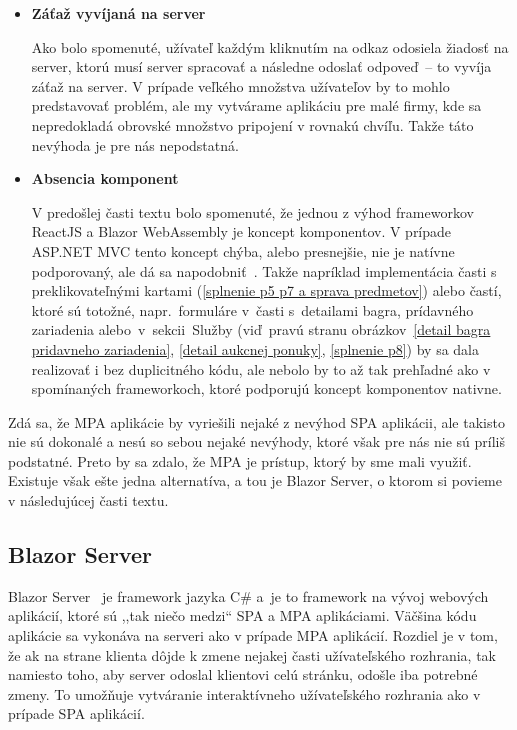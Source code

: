 \begin{itemize}
\item \textbf{Záťaž vyvíjaná na server}

Ako bolo spomenuté, užívateľ každým kliknutím na odkaz odosiela žiadosť na server, ktorú musí server spracovať a následne odoslať odpoveď~-- to vyvíja záťaž na server. V prípade veľkého množstva užívateľov by to mohlo predstavovať problém, ale my vytvárame aplikáciu pre malé firmy, kde sa nepredokladá obrovské množstvo pripojení v rovnakú chvíľu. Takže táto nevýhoda je pre nás nepodstatná.

\item \textbf{Absencia komponent}

V predošlej časti textu bolo spomenuté, že jednou z výhod frameworkov ReactJS a Blazor WebAssembly je koncept komponentov. V prípade ASP.NET MVC tento koncept chýba, alebo presnejšie, nie je natívne podporovaný, ale dá sa napodobniť~\cite{components in aspnet mvc}. Takže napríklad implementácia časti s preklikovateľnými kartami (\ref{splnenie p5 p7 a sprava predmetov}) alebo častí, ktoré sú totožné, napr.~formuláre v~časti s~detailami bagra, prídavného zariadenia alebo~v~sekcii~Služby (viď~pravú stranu obrázkov~\ref{detail bagra pridavneho zariadenia}, \ref{detail aukcnej ponuky}, \ref{splnenie p8}) by sa dala realizovať i bez duplicitného kódu, ale nebolo by to až tak prehľadné ako v spomínaných frameworkoch, ktoré podporujú koncept komponentov nativne.
\end{itemize}

Zdá sa, že MPA aplikácie by vyriešili nejaké z nevýhod SPA aplikácii, ale takisto nie sú dokonalé a nesú so sebou nejaké nevýhody, ktoré však pre nás nie sú príliš podstatné. Preto by sa zdalo, že MPA je prístup, ktorý by sme mali využiť. Existuje však ešte jedna alternatíva, a tou je Blazor Server, o ktorom si povieme v následujúcej časti textu.

\subsection{Blazor Server}

Blazor Server~\cite{blazor server} je framework jazyka C\# a~je to framework na vývoj webových aplikácií, ktoré sú ,,tak niečo medzi`` SPA a MPA aplikáciami. Väčšina kódu aplikácie sa vykonáva na serveri ako v prípade MPA aplikácií. Rozdiel je v tom, že ak na strane klienta dôjde k zmene nejakej časti užívateľského rozhrania, tak namiesto toho, aby server odoslal klientovi celú stránku, odošle iba potrebné zmeny. To umožňuje vytváranie interaktívneho užívateľského rozhrania ako v prípade SPA aplikácií.

